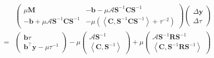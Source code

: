 \documentclass[10pt]{article}
\begin{document}
{\begin{eqnarray}
  &  & \left(\begin{array}{cc}
    \mu \mathbf{M} & - \mathbf{b} - \mu \mathcal{A} \mathbf{S}^{- 1} \mathbf{C} \mathbf{S}^{- 1}\\
    - \mathbf{b} + \mu \mathcal{A} \mathbf{S}^{- 1} \mathbf{C} \mathbf{S}^{- 1} & - \mu \left(
    \left\langle \mathbf{C}, \mathbf{S}^{- 1} \mathbf{C} \mathbf{S}^{- 1} \right\rangle + \tau^{- 2} \right)
  \end{array}\right) \left(\begin{array}{c}
    \Delta \mathbf{y}\\
    \Delta \tau
  \end{array}\right)\\ \nonumber
  & = & \left(\begin{array}{c}
    \mathbf{b} \tau\\
    \mathbf{b}^{\top} \mathbf{y} - \mu \tau^{- 1}
  \end{array}\right) - \mu \left(\begin{array}{c}
    \mathcal{A} \mathbf{S}^{- 1}\\
    \left\langle \mathbf{C}, \mathbf{S}^{- 1} \right\rangle
  \end{array}\right) + \mu \left(\begin{array}{c}
    \mathcal{A} \mathbf{S}^{- 1} \mathbf{R} \mathbf{S}^{- 1}\\
    \left\langle \mathbf{C}, \mathbf{S}^{- 1} \mathbf{R} \mathbf{S}^{- 1} \right\rangle
  \end{array}\right) \\ \nonumber
\end{eqnarray}

}
\end{document}
